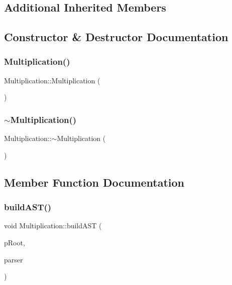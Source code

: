 \subsection*{Additional Inherited Members}


\subsection{Constructor \& Destructor Documentation}
\mbox{\label{class_multiplication_a814ccc71b369d0d0b947722a0a24c42e}} 
\subsubsection{\texorpdfstring{Multiplication()}{Multiplication()}}
{\footnotesize\ttfamily Multiplication\+::\+Multiplication (\begin{DoxyParamCaption}{ }\end{DoxyParamCaption})}

\mbox{\label{class_multiplication_ae81a978764f3a1578d1e659a1bbf6485}} 
\subsubsection{\texorpdfstring{$\sim$Multiplication()}{~Multiplication()}}
{\footnotesize\ttfamily Multiplication\+::$\sim$\+Multiplication (\begin{DoxyParamCaption}{ }\end{DoxyParamCaption})}



\subsection{Member Function Documentation}
\mbox{\label{class_multiplication_a0bf6680544c5d519ae23597696938a2a}} 
\subsubsection{\texorpdfstring{buildAST()}{buildAST()}}
{\footnotesize\ttfamily void Multiplication\+::build\+A\+ST (\begin{DoxyParamCaption}\item[{std\+::unique\+\_\+ptr$<$ \mbox{\hyperlink{class_abstract_expression}{Abstract\+Expression}} $>$ \&}]{p\+Root,  }\item[{\mbox{\hyperlink{class_parser}{Parser}} \&}]{parser }\end{DoxyParamCaption})\hspace{0.3cm}{\ttfamily [virtual]}}



